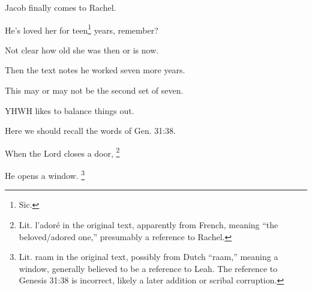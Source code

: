 {
}
{
}
{
	Jacob finally comes to Rachel.
	
	He's loved her for teen\footnote{Sic.} years, remember?

	Not clear how old she was then or is now.
	
	Then the text notes he worked seven more years.
	
	This may or may not be the second set of seven.
}

{
}
{
}
{
	YHWH likes to balance things out.
	
	Here we should recall the words of Gen. 31:38.

	When the Lord closes a door,%
		\footnote{
			Lit. l'adoré in the original text,
			apparently from French, meaning ``the beloved/adored one,''
			presumably a reference to Rachel.
		}

	He opens a window.%
		\footnote{
		Lit. raam in the original text, possibly from Dutch ``raam,''
		meaning a window, generally believed to be a reference to Leah.
		The reference to Genesis 31:38 is incorrect, likely a later
		addition or scribal corruption.
	}
}

